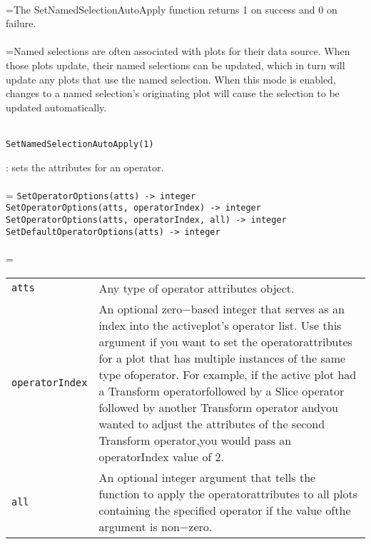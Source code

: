 \documentclass[10pt,a4paper]{report}
\begin{document}
 \\ 
\hangindent=\parindent The SetNamedSelectionAutoApply function returns 1 on success and 0 on failure. \\[-3mm] 

 \\ 
\hangindent=\parindent Named selections are often associated with plots for their data source. When those plots update, their named selections can be updated, which in turn will update any plots that use the named selection. When this mode is enabled, changes to a named selection's originating plot will cause the selection to be updated automatically. \\[-3mm] 

\\[-6mm]
\begin{verbatim}SetNamedSelectionAutoApply(1)
\end{verbatim}
\newpage


{}
: sets the attributes for an operator.\\[-3mm]

 \\ 
\hangindent=\parindent 
\verb!SetOperatorOptions(atts) -> integer!\\ 
\verb!SetOperatorOptions(atts, operatorIndex) -> integer!\\ 
\verb!SetOperatorOptions(atts, operatorIndex, all) -> integer!\\ 
\verb!SetDefaultOperatorOptions(atts) -> integer!\\ [-3mm]

 \\ 
\hangindent=\parindent 
\begin{tabular}{lp{9cm}}
\verb!atts! & Any type of operator attributes object. \\
\verb!operatorIndex! & An optional zero$-$based integer that serves as an index into the activeplot's operator list. Use this argument if you want to set the operatorattributes for a plot that has multiple instances of the same type ofoperator. For example, if the active plot had a Transform operatorfollowed by a Slice operator followed by another Transform operator andyou wanted to adjust the attributes of the second Transform operator,you would pass an operatorIndex value of 2. \\
\verb!all! & An optional integer argument that tells the function to apply the operatorattributes to all plots containing the specified operator if the value ofthe argument is non$-$zero. \\
\end{tabular} \\[-2mm]
\end{document}
